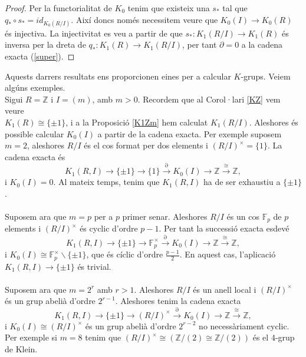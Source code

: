 \begin{proof}
Per la functorialitat de $K_0$ tenim que existeix una $s_*$ tal que $q_* \circ s_* = id_{K_0(R/I)}$. Així doncs només necessitem veure que $K_0(I)\rightarrow K_0(R)$ és injectiva. La injectivitat es veu a partir de que $s_*: K_1(R/I)\rightarrow K_1(R)$ és inversa per la dreta de $q_*:K_1(R)\rightarrow K_1(R/I)$, per tant $\partial = 0$ a la cadena exacta (\ref{super}).
\end{proof}

\begin{exemples}
Aquests darrers resultats ens proporcionen eines per a calcular $K$-grups. Veiem algúns exemples.\\
\indent Sigui $R=\mathbb{Z}$ i $I=(m)$, amb $m>0$. Recordem que al Corol·lari \ref{KZ} vem veure \\ $K_1(R)\cong \{\pm 1\}$, i a la Proposició \ref{K1Zm} hem calculat $K_1(R/I)$. Aleshores és possible calcular $K_0(I)$ a partir de la cadena exacta. Per exemple suposem $m=2$, aleshores $R/I$ és el cos format per dos elements i $(R/I)^{\times}=\{1\}$. La cadena exacta és
$$
K_1(R,I)\rightarrow \{\pm 1\} \rightarrow \{1\} \xrightarrow{\partial} K_0(I) \rightarrow \mathbb{Z} \xrightarrow{\cong} \mathbb{Z},
$$
i $K_0(I)=0$. Al mateix temps, tenim que $K_1(R,I)$ ha de ser exhaustiu a $\{\pm 1\}$.\\\\
\indent Suposem ara que $m=p$ per a $p$ primer senar. Aleshores $R/I$ és un cos $\mathbb{F}_p$ de $p$ elements i $(R/I)^{\times}$ és cyclic d'ordre $p-1$. Per tant la successió exacta esdevé
$$
K_1(R,I)\rightarrow \{\pm 1\} \rightarrow \mathbb{F}_p^{\times} \xrightarrow{\partial} K_0(I) \rightarrow \mathbb{Z} \xrightarrow{\cong} \mathbb{Z},
$$
i $K_0(I)\cong \mathbb{F}_p^{\times} \backslash \{\pm 1\}$, que és cíclic d'ordre $\frac{p-1}{2}$. En aquest cas, l'aplicació $K_1(R,I)\rightarrow \{\pm 1\}$ és trivial.
\\ \\
\indent Suposem ara que $m=2^r$ amb $r>1$. Aleshores $R/I$ és un anell local i $(R/I)^{\times}$ és un grup abelià d'ordre $2^{r-1}$.  Aleshores tenim la cadena exacta
$$
K_1(R,I)\rightarrow \{\pm 1\} \rightarrow (R/I)^{\times} \xrightarrow{\partial} K_0(I) \rightarrow \mathbb{Z}\xrightarrow{\cong} \mathbb{Z},
$$
i $K_0(I)\cong (R/I)^{\times}$ és un grup abelià d'ordre $2^{r-2}$ no necessàriament cyclic. Per exemple si $m=8$ tenim que $(R/I)^\times \cong (\mathbb{Z}/(2)\cong \mathbb{Z}/(2))$ és el 4-grup de Klein.
\end{exemples}